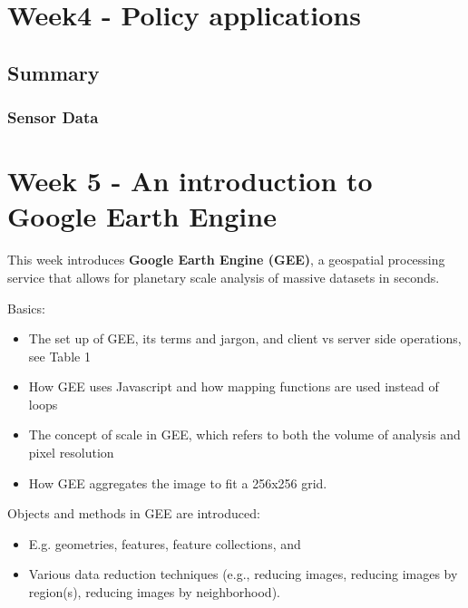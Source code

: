 \documentclass[
  letterpaper,
  DIV=11,
  numbers=noendperiod]{scrreprt}
\providecommand{\tightlist}{%
  \setlength{\itemsep}{0pt}\setlength{\parskip}{0pt}}\usepackage{longtable,booktabs,array}
\begin{document}

\hypertarget{week4---policy-applications}{%
\chapter{Week4 - Policy
applications}\label{week4---policy-applications}}

\hypertarget{summary-2}{%
\section{Summary}\label{summary-2}}

\hypertarget{sensor-data}{%
\subsection{Sensor Data}\label{sensor-data}}


\hypertarget{week-5---an-introduction-to-google-earth-engine}{%
\chapter{Week 5 - An introduction to Google Earth
Engine}\label{week-5---an-introduction-to-google-earth-engine}}

This week introduces \textbf{Google Earth Engine (GEE)}, a geospatial
processing service that allows for planetary scale analysis of massive
datasets in seconds.

Basics:

\begin{itemize}
\tightlist
\item
  The set up of GEE, its terms and jargon, and client vs server side
  operations, see Table 1
\item
  How GEE uses Javascript and how mapping functions are used instead of
  loops
\item
  The concept of scale in GEE, which refers to both the volume of
  analysis and pixel resolution
\item
  How GEE aggregates the image to fit a 256x256 grid.
\end{itemize}

Objects and methods in GEE are introduced:

\begin{itemize}
\tightlist
\item
  E.g. geometries, features, feature collections, and
\item
  Various data reduction techniques (e.g., reducing images, reducing
  images by region(s), reducing images by neighborhood).
\end{itemize}
\end{document}
